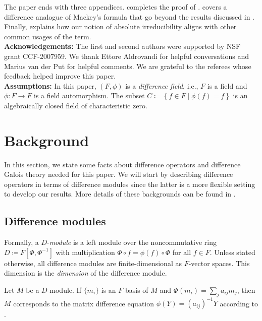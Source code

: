 \documentclass[11pt,reqno]{amsart}
\theoremstyle{definition}
\begin{document}
The paper ends with three appendices.  completes the proof of . 
 covers a difference analogue of Mackey's formula that go beyond the results discussed in .
Finally,  explains how our notion of absolute irreducibility aligns with other common usages of the term.\\

\noindent\textbf{Acknowledgements:} 
The first and second authors were supported by NSF grant CCF-2007959. 
We thank Ettore Aldrovandi for helpful conversations and Marius van der Put for helpful comments.
We are grateful to the referees whose feedback helped improve this paper.
\\

\noindent\textbf{Assumptions:} In this paper,
$(F,\phi)$ is a \emph{difference field}, i.e., $F$ is a field and $\phi:F\to F$ is a field automorphism.
The subset $C\coloneqq \left\lbrace f\in F\mid \phi(f)=f\right\rbrace$ is an algebraically closed field of characteristic zero.



\section{Background}
\label{section:background}
In this section, we state some facts about difference operators and difference Galois theory needed for this paper. 
We will start by describing difference operators in terms of difference modules since the latter is a more flexible setting to develop our results.
More details of these backgrounds can be found in \cite[Chapter 1]{put2006galois}.

\subsection{Difference modules}

Formally, a $D$-\emph{module} is a left module over the noncommutative ring $D\coloneqq F[\Phi,\Phi^{-1}]$ with multiplication $\Phi\circ f= \phi(f)\circ \Phi$ for all $f\in F$. 
Unless stated otherwise, all difference modules are finite-dimensional as $F$-vector spaces. 
This dimension is the \emph{dimension} of the difference module.

Let $M$ be a $D$-module.
If $\{m_{i}\}$ is an $F$-basis of $M$ and $\Phi(m_{i})=\sum_{j} a_{ij}m_{j}$, then $M$ corresponds to the matrix difference equation $\phi(Y)=(a_{ij})^{-1}Y$ according to \cite[Section 1.4]{put2006galois}.
\end{document}
